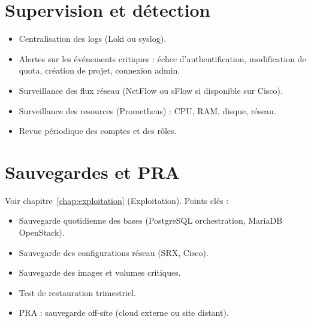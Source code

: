 \section{Supervision et détection}
\begin{itemize}
  \item Centralisation des logs (Loki ou syslog).
  \item Alertes sur les événements critiques : échec d'authentification, modification de quota, création de projet, connexion admin.
  \item Surveillance des flux réseau (NetFlow ou sFlow si disponible sur Cisco).
  \item Surveillance des resources (Prometheus) : CPU, RAM, disque, réseau.
  \item Revue périodique des comptes et des rôles.
\end{itemize}

\section{Sauvegardes et PRA}
Voir chapitre~\ref{chap:exploitation} (Exploitation). Points clés :
\begin{itemize}
  \item Sauvegarde quotidienne des bases (PostgreSQL orchestration, MariaDB OpenStack).
  \item Sauvegarde des configurations réseau (SRX, Cisco).
  \item Sauvegarde des images et volumes critiques.
  \item Test de restauration trimestriel.
  \item PRA : sauvegarde off-site (cloud externe ou site distant).
\end{itemize}